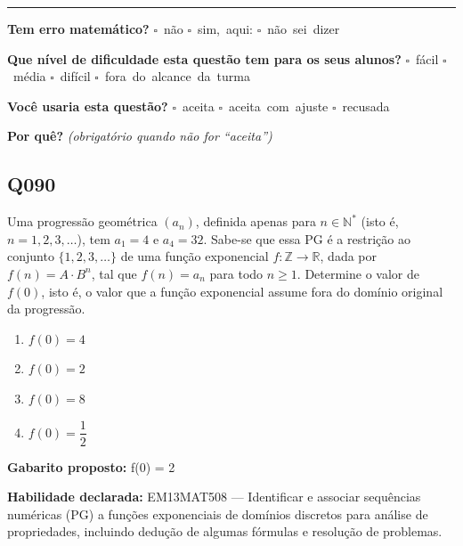 \documentclass[11pt,a4paper]{article}
\begin{document}
\noindent\rule{\linewidth}{0.4pt}
\textbf{Tem erro matemático?}\quad
\mbox{$\square$~não} \quad \mbox{$\square$~sim, aqui:} \underline{\hspace{5cm}}
\quad \mbox{$\square$~não sei dizer}

\textbf{Que nível de dificuldade esta questão tem para os seus alunos?}\quad
\mbox{$\square$~fácil} \quad \mbox{$\square$~média} \quad
\mbox{$\square$~difícil} \quad \mbox{$\square$~fora do alcance da turma}

\textbf{Você usaria esta questão?}\quad
\mbox{$\square$~aceita} \quad \mbox{$\square$~aceita com ajuste} \quad
\mbox{$\square$~recusada}

\textbf{Por quê?} \emph{(obrigatório quando não for ``aceita'')}

\underline{\hspace{\linewidth}}

\underline{\hspace{\linewidth}}
\vspace{0.6em}

\begin{samepage}
\subsection*{Q090}
Uma progressão geométrica $(a_n)$, definida apenas para $n \in \mathbb{N}^*$ (isto é, $n = 1, 2, 3, \dots$), tem $a_1 = 4$ e $a_4 = 32$. Sabe-se que essa PG é a restrição ao conjunto $\{1,2,3,\dots\}$ de uma função exponencial $f:\mathbb{Z}\to\mathbb{R}$, dada por $f(n) = A\cdot B^n$, tal que $f(n) = a_n$ para todo $n \geq 1$. Determine o valor de $f(0)$, isto é, o valor que a função exponencial assume fora do domínio original da progressão.
\begin{enumerate}[label=(\alph*),nosep,leftmargin=*]
\item $f(0) = 4$
\item $f(0) = 2$
\item $f(0) = 8$
\item $f(0) = \dfrac{1}{2}$
\end{enumerate}

\textbf{Gabarito proposto:} f(0) = 2

\textbf{Habilidade declarada:} EM13MAT508 --- Identificar e associar sequências numéricas (PG) a funções exponenciais de domínios discretos para análise de propriedades, incluindo dedução de algumas fórmulas e resolução de problemas.
\end{samepage}
\end{document}
